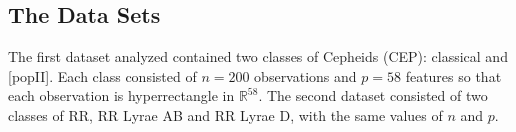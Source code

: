 \documentclass[10pt]{article}
\theoremstyle{definition}
\begin{document}









\subsection{The Data Sets}
The first dataset analyzed contained two classes of Cepheids (CEP):  classical and [popII].  Each class consisted of $n=200$ observations and $p=58$ features so that each observation is hyperrectangle in $\mathbb{R}^{58}$. The second dataset consisted of two classes of RR,  RR Lyrae AB and RR Lyrae D, with the same values of $n$ and $p$.
\end{document}

